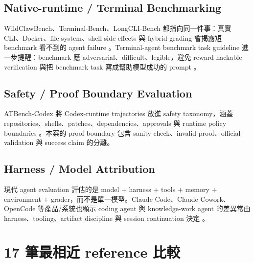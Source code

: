 \documentclass[UTF8,a4paper,11pt]{ctexart}
\begin{document}
\subsection{Native-runtime / Terminal Benchmarking}

WildClawBench、Terminal-Bench、LongCLI-Bench 都指向同一件事：真實 CLI、Docker、file system、shell side effects 與 hybrid grading 會揭露短 benchmark 看不到的 agent failure \citep{wildclawbench,terminalbench,longclibench}。Terminal-agent benchmark task guideline 進一步提醒：benchmark 應 adversarial、difficult、legible，避免 reward-hackable verification 與把 benchmark task 寫成幫助模型成功的 prompt \citep{terminaltaskguideline}。

\subsection{Safety / Proof Boundary Evaluation}

ATBench-Codex 將 Codex-runtime trajectories 放進 safety taxonomy，涵蓋 repositories、shells、patches、dependencies、approvals 與 runtime policy boundaries \citep{atbenchcodex}。本案的 proof boundary 包含 sanity check、invalid proof、official validation 與 success claim 的分離。

\subsection{Harness / Model Attribution}

現代 agent evaluation 評估的是 model + harness + tools + memory + environment + grader，而不是單一模型。Claude Code、Claude Cowork、OpenCode 等產品/系統也顯示 coding agent 與 knowledge-work agent 的差異常由 harness、tooling、artifact discipline 與 session continuation 決定 \citep{claudecode,claudecowork,opencode,contextengineeringpaper}。

\section{17 筆最相近 reference 比較}
\end{document}
